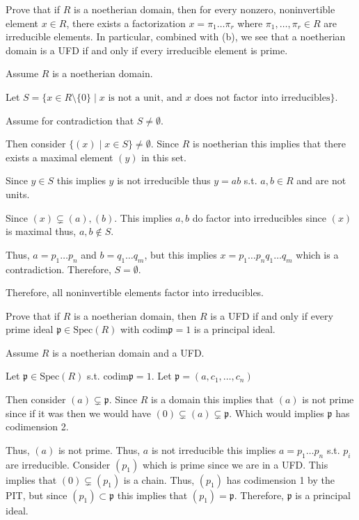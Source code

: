 \documentclass[12pt, letterpaper]{article}
\newcommand{\p}{\mathfrak{p}}
\renewcommand{\t}[1]{\text{#1}}
\newcommand{\Spec}{\mathrm{Spec}}
\newcommand{\codim}{\mathrm{codim}}
\begin{document}
\begin{subproblem}{}
    Prove that if $R$ is a noetherian domain, then for every nonzero, noninvertible element
$x \in R$, there exists a factorization $x = \pi_1 \dots \pi_r$ where $\pi_1, \dots , \pi_r \in R$ are irreducible
elements. In particular, combined with (b), we see that a noetherian domain is a UFD
if and only if every irreducible element is prime.
\end{subproblem}
\begin{problemproof}
    Assume $R$ is a noetherian domain.

    Let $S = \{x \in R \setminus \{0\} \mid x \t{ is not a unit, and $x$ does not factor into irreducibles}\}$.

    Assume for contradiction that $S \neq \emptyset$.

    Then consider $\{(x) \mid x \in S\} \neq \emptyset$. Since $R$ is noetherian this implies that there exists a maximal element $(y)$ in this set.

    Since $y \in S$ this implies $y$ is not irreducible thus $y=ab$ s.t. $a,b \in R$ and are not units.

    Since $(x) \subsetneq (a),(b)$. This implies $a,b$ do factor into irreducibles since $(x)$ is maximal thus, $a,b \notin S$.

    Thus, $a=p_1\dots p_n$ and $b=q_1 \dots q_m$, but this implies $x=p_1\dots p_n q_1 \dots q_m$ which is a contradiction. Therefore, $S = \emptyset$.

    Therefore, all noninvertible elements factor into irreducibles.
\end{problemproof}

\begin{subproblem}{}
    Prove that if $R$ is a noetherian domain, then $R$ is a UFD if and only if every prime
ideal $\p \in \Spec(R)$ with $\codim \p = 1$ is a principal ideal.
\end{subproblem}
\begin{problemproof}
    Assume $R$ is a noetherian domain and a UFD.

    Let $\p \in \Spec(R)$ s.t. $\codim \p = 1$. Let $\p=(a,c_1,\dots,c_n)$

    Then consider $(a) \subsetneq \p$. Since $R$ is a domain this implies that $(a)$ is not prime since if it was then we would have $(0) \subsetneq (a) \subsetneq \p$. Which would implies $\p$ has codimension 2.

    Thus, $(a)$ is not prime. Thus, $a$ is not irreducible this implies $a=p_1 \dots p_n$ s.t. $p_i$ are irreducible. Consider $(p_1)$ which is prime since we are in a UFD. This implies that $(0) \subsetneq (p_1)$ is a chain. Thus,
    $(p_1)$ has codimension 1 by the PIT, but since $(p_1) \subset \p$ this implies that $(p_1) = \p$. Therefore, $\p$ is a principal ideal.
\end{problemproof}
\end{document}
